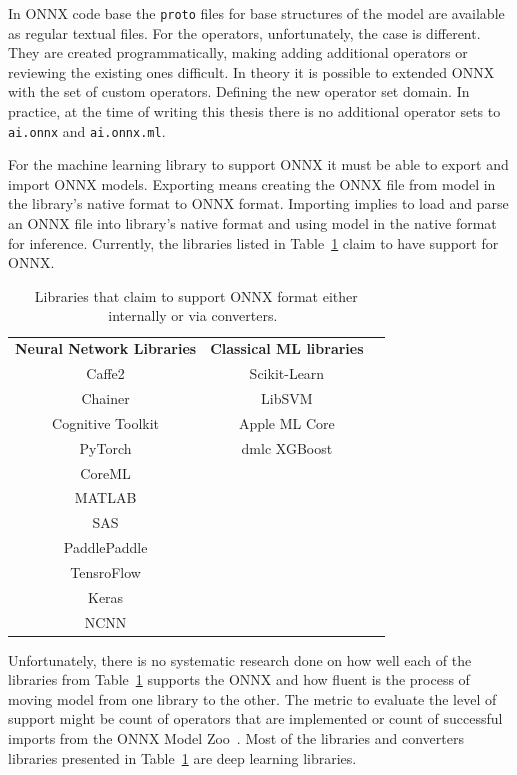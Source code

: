 \documentclass[english, 12pt, a4paper, elec, utf8, online]{aaltothesis}
\begin{document}
In ONNX code base the \texttt{proto} files for base structures of the model are available as regular textual files. For the operators, unfortunately, the case is different. They are created programmatically, making adding additional operators or reviewing the existing ones difficult. In theory it is possible to extended ONNX with the set of custom operators. Defining the new operator set domain. In practice, at the time of writing this thesis there is no additional operator sets to \texttt{ai.onnx} and \texttt{ai.onnx.ml}.

For the machine learning library to support ONNX it must be able to export and import ONNX models. Exporting means creating the ONNX file from model in the library's native format to ONNX format. Importing implies to load and parse an ONNX file into library's native format and using model in the native format for inference. Currently, the libraries listed in Table~\ref{tab:onnx_libraries} claim to have support for ONNX.

\begin{table}[h!]
\begin{center}
\caption[Libraries that claim to support ONNX format either internally or via converters.]{Libraries that claim to support ONNX format either internally or via converters.~\cite{onnx_tools}} \label{tab:onnx_libraries}
\begin{tabular}{ c c c }
 \textbf{Neural Network Libraries} & \textbf{Classical ML libraries} \\	
 Caffe2            & Scikit-Learn  \\ 
 Chainer           & LibSVM  \\  
 Cognitive Toolkit & Apple ML Core \\    
 PyTorch           & dmlc XGBoost \\
 CoreML            \\
 MATLAB            \\
 SAS               \\
 PaddlePaddle      \\ 
 TensroFlow        \\
 Keras             \\
 NCNN              \\
\end{tabular}
\end{center}
\end{table}

Unfortunately, there is no systematic research done on how well each of the libraries from Table~\ref{tab:onnx_libraries} supports the ONNX and how fluent is the process of moving model from one library to the other. The metric to evaluate the level of support might be count of operators that are implemented or count of successful imports from the ONNX Model Zoo~\cite{onnx_model_zoo}. Most of the libraries and converters libraries presented in Table~\ref{tab:onnx_libraries} are deep learning libraries. 
\end{document}
